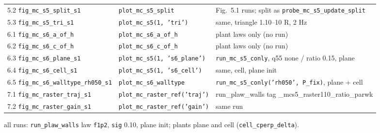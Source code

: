 {\begin{tabular}{@{}L{6.4cm}L{4.8cm}L{4.4cm}@{}}
5.2 \texttt{fig\_\allowbreak{}mc\_\allowbreak{}s5\_\allowbreak{}split\_\allowbreak{}s1} & \texttt{plot\_\allowbreak{}mc\_\allowbreak{}s5\_\allowbreak{}split} & Fig.~5.1 runs; split as \texttt{probe\_\allowbreak{}mc\_\allowbreak{}s5\_\allowbreak{}update\_\allowbreak{}split} \\
5.3 \texttt{fig\_\allowbreak{}mc\_\allowbreak{}s5\_\allowbreak{}tri\_\allowbreak{}s1} & \texttt{plot\_\allowbreak{}mc\_\allowbreak{}s5(1, 'tri')} & same, triangle 1.10--10 R, 2 Hz \\
6.1 \texttt{fig\_\allowbreak{}mc\_\allowbreak{}s6\_\allowbreak{}a\_\allowbreak{}of\_\allowbreak{}h} & \texttt{plot\_\allowbreak{}mc\_\allowbreak{}s6\_\allowbreak{}a\_\allowbreak{}of\_\allowbreak{}h} & plant laws only (no run) \\
6.2 \texttt{fig\_\allowbreak{}mc\_\allowbreak{}s6\_\allowbreak{}c\_\allowbreak{}of\_\allowbreak{}h} & \texttt{plot\_\allowbreak{}mc\_\allowbreak{}s6\_\allowbreak{}c\_\allowbreak{}of\_\allowbreak{}h} & plant laws only (no run) \\
6.3 \texttt{fig\_\allowbreak{}mc\_\allowbreak{}s6\_\allowbreak{}plane\_\allowbreak{}s1} & \texttt{plot\_\allowbreak{}mc\_\allowbreak{}s5(1, 's6\_\allowbreak{}plane')} & \texttt{run\_\allowbreak{}mc\_\allowbreak{}s5\_\allowbreak{}conly}, q55 none / ratio 0.15, plane \\
6.4 \texttt{fig\_\allowbreak{}mc\_\allowbreak{}s6\_\allowbreak{}cell\_\allowbreak{}s1} & \texttt{plot\_\allowbreak{}mc\_\allowbreak{}s5(1, 's6\_\allowbreak{}cell')} & same, cell, plane init \\
6.5 \texttt{fig\_\allowbreak{}mc\_\allowbreak{}s6\_\allowbreak{}walltype\_\allowbreak{}rh050\_\allowbreak{}s1} & \texttt{plot\_\allowbreak{}mc\_\allowbreak{}s6\_\allowbreak{}walltype} & \texttt{run\_\allowbreak{}mc\_\allowbreak{}s5\_\allowbreak{}conly('rh050', P\_fix)}, plane + cell \\
7.1 \texttt{fig\_\allowbreak{}mc\_\allowbreak{}raster\_\allowbreak{}traj\_\allowbreak{}s1} & \texttt{plot\_\allowbreak{}mc\_\allowbreak{}raster\_\allowbreak{}ref('traj')} & run\_plaw\_walls tag \_mcs5\_raster110\_ratio\_parwk \\
7.2 \texttt{fig\_\allowbreak{}mc\_\allowbreak{}raster\_\allowbreak{}gain\_\allowbreak{}s1} & \texttt{plot\_\allowbreak{}mc\_\allowbreak{}raster\_\allowbreak{}ref('gain')} & same run \\
\bottomrule
\end{tabular}
}

\smallskip
{\small all runs: \texttt{run\_plaw\_walls} law \texttt{f1p2}, \texttt{sig} 0.10, plane init; plants plane and cell (\texttt{cell\_cperp\_delta}).}
